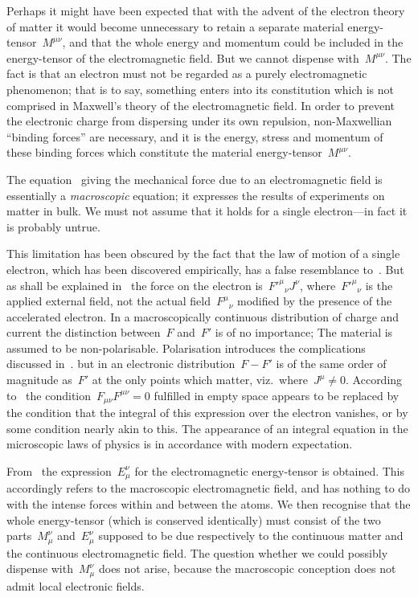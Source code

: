 \documentclass[12pt]{book}
\begin{document}
Perhaps it might have been expected that with the advent of the electron
%
theory of matter it would become unnecessary to retain a separate material
energy-tensor~$M^{\mu\nu}$, and that the whole energy and momentum could be
included in the energy-tensor of the electromagnetic field. But we cannot
dispense with~$M^{\mu\nu}$. The fact is that an electron must not be regarded as a
purely electromagnetic phenomenon; that is to say, something enters into its
constitution which is not comprised in Maxwell's theory of the electromagnetic
field. In order to prevent the electronic charge from dispersing under its own
repulsion, non-Maxwellian ``binding forces'' are necessary, and it is the energy,
stress and momentum of these binding forces which constitute the material
energy-tensor~$M^{\mu\nu}$.

The equation~ giving the mechanical force due to an electromagnetic field is essentially a
\emph{macroscopic} equation; it expresses the results of experiments on matter in bulk.
We must not assume that it holds for a single electron---in fact it is probably untrue.

This limitation has been obscured by the fact that the law of motion of a single electron, which has been
discovered empirically, has a false resemblance to~.
But as shall be explained in~ the force on the electron is~${F'^\mu}_\nu J^\nu$, where~${F'^\mu}_\nu$ is
the applied external field, not the actual field~${F^\mu}_\nu$ modified by the presence of the accelerated electron.
In a macroscopically continuous distribution of charge and current the distinction between~$F$ and~$F'$ is of no
importance\footnotemark;\footnotetext
            {The material is assumed to be non-polarisable.
             Polarisation introduces the complications discussed in~.}
but in an electronic distribution~$F-F'$ is of the same order of magnitude as~$F'$ at the only points which matter,
viz.\ where~$J^\mu\neq 0$. According to~ the condition~$F_{\mu\nu}F^{\mu\nu}=0$ fulfilled in empty space
appears to be replaced by the condition that the integral of this expression over the electron vanishes,
or by some condition nearly akin to this.
The appearance of an integral equation in the microscopic laws of physics is in accordance with modern expectation.

From~ the expression~$E^\nu_\mu$ for the electromagnetic energy-tensor is obtained.
This accordingly refers to the macroscopic electromagnetic field, and has nothing to do with the intense
forces within and between the atoms.
We then recognise that the whole energy-tensor (which is conserved identically) must consist of the two
parts~$M^\nu_\mu$ and~$E^\nu_\mu$ supposed to be due respectively to the continuous matter and the continuous
electromagnetic field.
The question whether we could possibly dispense with~$M^\nu_\mu$ does not arise, because the macroscopic
conception does not admit local electronic fields.
\end{document}
